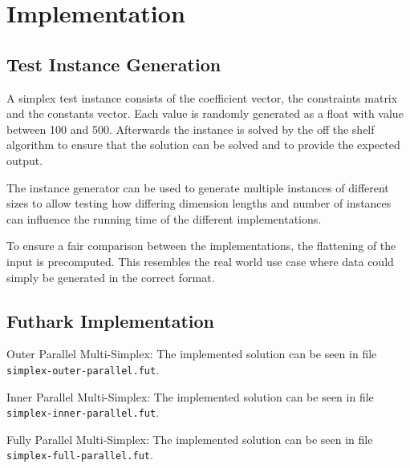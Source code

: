 \section{Implementation}
\subsection{Test Instance Generation}
A simplex test instance consists of the coefficient vector, the constraints matrix and the constants vector. Each value is randomly generated as a float with value between 100 and 500. Afterwards the instance is solved by the off the shelf algorithm to ensure that the solution can be solved and to provide the expected output. 

The instance generator can be used to generate multiple instances of different sizes to allow testing how differing dimension lengths and number of instances can influence the running time of the different implementations.

To ensure a fair comparison between the implementations, the flattening of the input is precomputed. This resembles the real world use case where data could simply be generated in the correct format. 

\subsection{Futhark Implementation}
Outer Parallel Multi-Simplex:
The implemented solution can be seen in file \texttt{simplex-outer-parallel.fut}.

\newpar
Inner Parallel Multi-Simplex:
The implemented solution can be seen in file \texttt{simplex-inner-parallel.fut}.

\newpar
Fully Parallel Multi-Simplex:
The implemented solution can be seen in file \texttt{simplex-full-parallel.fut}.
